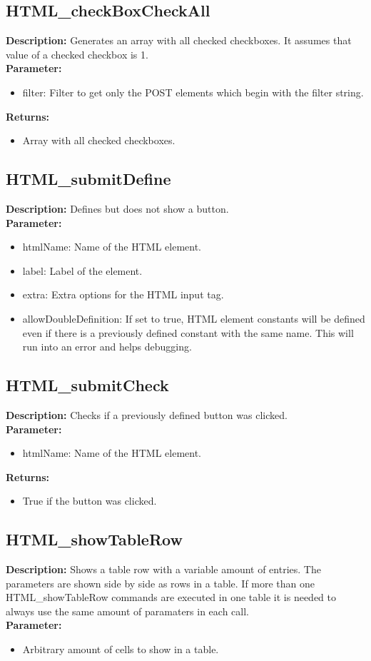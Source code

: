 \subsection{HTML\_checkBoxCheckAll}
\textbf{Description:} Generates an array with all checked checkboxes. It assumes that value of a checked checkbox is 1.\\
\textbf{Parameter:}
\begin{itemize}
\item filter: Filter to get only the POST elements which begin with the filter string.
\end{itemize}
\textbf{Returns:}
\begin{itemize}
\item Array with all checked checkboxes.
\end{itemize}

\subsection{HTML\_submitDefine}
\textbf{Description:} Defines but does not show a button.\\
\textbf{Parameter:}
\begin{itemize}
\item htmlName: Name of the HTML element.
\item label: Label of the element.
\item extra: Extra options for the HTML input tag.
\item allowDoubleDefinition: If set to true, HTML element constants will be defined even if there is a previously defined constant with the same name. This will run into an error and helps debugging.
\end{itemize}

\subsection{HTML\_submitCheck}
\textbf{Description:} Checks if a previously defined button was clicked.\\
\textbf{Parameter:}
\begin{itemize}
\item htmlName: Name of the HTML element.
\end{itemize}
\textbf{Returns:}
\begin{itemize}
\item True if the button was clicked.
\end{itemize}

\subsection{HTML\_showTableRow}
\textbf{Description:} Shows a table row with a variable amount of entries. The parameters are shown side by side as rows in a table. If more than one HTML\_showTableRow commands are executed in one table it is needed to always use the same amount of paramaters in each call.\\
\textbf{Parameter:}
\begin{itemize}
\item Arbitrary amount of cells to show in a table.
\end{itemize}

